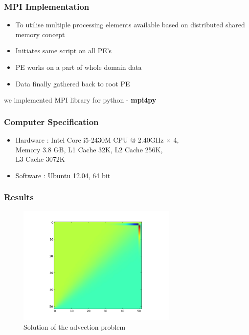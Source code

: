 \documentclass{beamer}
\begin{document}
\begin{frame}
\frametitle{MPI Implementation}
\begin{itemize}
\item To utilise multiple processing elements
available based on distributed shared memory concept
\item Initiates same script on all PE's
\item PE works on a part of whole domain data
\item Data finally gathered back to root PE 
\end{itemize}
we implemented MPI library for python - \textbf{mpi4py}
\end{frame}

\begin{frame}
\frametitle{Computer Specification}
\begin{itemize}
\item Hardware : Intel Core i5-2430M CPU @ 2.40GHz × 4, \\
\hspace{1.7cm} Memory 3.8 GB, L1 Cache 32K, L2 Cache 256K, \\
\hspace{1.7cm} L3 Cache 3072K
\item Software : Ubuntu 12.04, 64 bit
\end{itemize}
\end{frame}


\begin{frame}
\frametitle{Results}
\begin{figure}
\centering
\includegraphics[width=0.7\textwidth]{image52} %
\caption{Solution of the advection problem}
\end{figure}
\end{frame}
\end{document}
